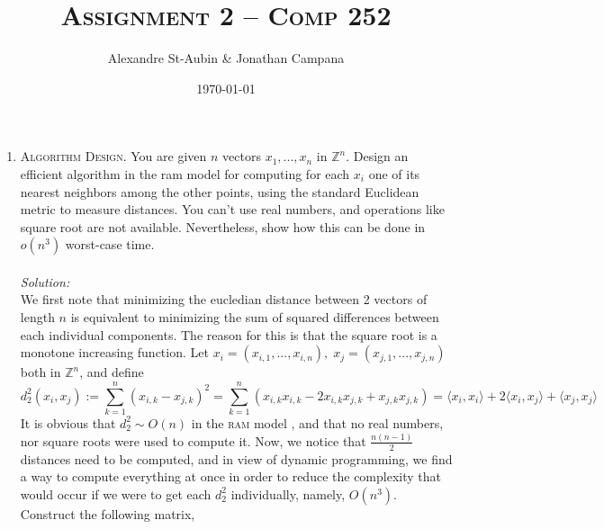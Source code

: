 \documentclass[12pt]{article}
\title{\textsc{Assignment 2 -- Comp 252}}
\author{Alexandre St-Aubin \& Jonathan Campana}
\date{\today}
\theoremstyle{definition}
\theoremstyle{remark}
\newcommand\sol{%
  \\ 
  \\
  \textit{Solution:}\\%
}
\begin{document}
\maketitle 
\begin{enumerate}
  \item \textsc{Algorithm Design.}
You are given $n$ vectors $x_1,... , x_n$ in $\mathbb{Z}^n$. Design an efficient algorithm in the ram model for computing for each $x_i$ one of its nearest
neighbors among the other points, using the standard Euclidean metric to measure distances. You can’t
use real numbers, and operations like square root are not available. Nevertheless, show how this can be
done in $o(n^3)$ worst-case time.
\sol   
   We first note that minimizing the eucledian distance between 2 vectors of length $n$ is equivalent to minimizing the sum of squared differences between each individual components. The reason for this is that the square root is a monotone increasing function. Let $x_i = (x_{i,1}, ..., x_{i,n}), \; x_j = (x_{j,1}, ..., x_{j,n})$ both in $\mathbb{Z}^n$, and define 
  \begin{equation}d_2^2(x_i, x_j) := \sum_{k=1}^n (x_{i,k} -x_{j,k})^2 = \sum_{k=1}^n(x_{i,k}x_{i,k} - 2 x_{i,k} x_{j,k} + x_{j,k}x_{j,k}) = \langle x_i, x_i  \rangle + 2\langle x_i, x_j  \rangle  + \langle x_j, x_j  \rangle \end{equation}
  It is obvious that $d_2^2 \sim O(n)$ in the \textsc{ram} model , and that no real numbers, nor square roots were used to compute it. Now, we notice that $\frac{n(n-1)}{2}$ distances need to be computed, and in view of dynamic programming, we find a way to compute everything at once in order to reduce the complexity that would occur if we were to get each $d_2^2$ individually, namely, $O(n^3)$. Construct the following matrix, 


\end{enumerate}
\end{document}
